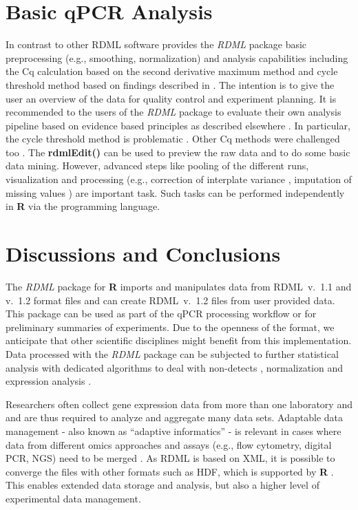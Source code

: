 \documentclass{bioinfo}
\begin{document}
\section{Basic qPCR Analysis}

In contrast to other RDML software provides the \textit{RDML} package basic 
preprocessing (e.g., smoothing, normalization) and analysis capabilities including the Cq calculation based on 
the second derivative maximum method and cycle threshold method based on 
findings described in \cite{roediger_RJ_2013, roediger2015chippcr, 
spiess_impact_2014, spiess_system-specific_2016}. The intention is to give the 
user an overview of the data for quality control and experiment planning. It 
is recommended to the users of the \textit{RDML} package to evaluate their own 
analysis pipeline based on evidence based principles as described elsewhere 
\cite{ritz_qpcr_2008, roediger2015r}. In particular, the cycle threshold method 
is problematic \cite{spiess_impact_2014, spiess_system-specific_2016}. Other Cq 
methods were challenged too \cite{ruijter_evaluation_2013}.
The \textbf{rdmlEdit()} can be used to preview the raw data and to do some basic 
data mining. However, advanced steps like pooling of the different runs, 
visualization and processing (e.g., correction of interplate variance \cite{ruijter_removal_2015}, 
imputation of missing values \cite{mccall_non-detects_2014}) are important task. Such tasks can be performed 
independently in \textbf{R} via the programming language.

\section{Discussions and Conclusions}

The \textit{RDML} package for \textbf{R} imports and manipulates data 
from RDML~v.~1.1 and v.~1.2 format files and can create RDML~v.~1.2 files 
from user provided data. This package can be used as part of the qPCR 
processing workflow or for preliminary summaries of experiments. Due to the 
openness of the format, we anticipate that other scientific disciplines might 
benefit from this implementation. Data processed with the \textit{RDML} package 
can be subjected to further statistical analysis with dedicated algorithms to 
deal with non-detects \cite{mccall_non-detects_2014}, normalization 
\cite{perkins_readqpcr_2012} and expression analysis \cite{dvinge_htqpcr:_2009, matz_no_2013}.

Researchers often collect gene expression data from more than one laboratory and 
and are thus required to analyze and aggregate many data sets. Adaptable data 
management - also known as “adaptive informatics” - is relevant in cases where 
data from different omics approaches and assays (e.g., flow cytometry, digital 
PCR, NGS) need to be merged \cite{baker_quantitative_2012}. As RDML is based on 
XML, it is possible to converge the files with other formats such as HDF, 
\cite{millard_adaptive_2011} which is supported by \textbf{R} 
\cite{Fischer_HDF5}. This enables extended data storage and analysis, but also a 
higher level of experimental data management.
\end{document}
